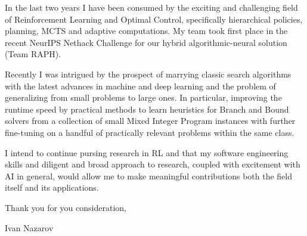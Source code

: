 \documentclass[14pt]{letter}
\begin{document}
In the last two years I have been consumed by the exciting and challenging field of Reinforcement
Learning and Optimal Control, specifically hierarchical policies, planning, MCTS and adaptive
computations. My team took first place in the recent NeurIPS Nethack Challenge for our hybrid
algorithmic-neural solution (Team RAPH).

Recently I was intrigued by the prospect of marrying classic search algorithms with the latest
advances in machine and deep learning and the problem of generalizing from small problems
to large ones. In particular, improving the runtime speed by practical methods to learn heuristics
for Branch and Bound solvers from a collection of small Mixed Integer Program instances with
further fine-tuning on a handful of practically relevant problems within the same class.

I intend to continue pursing research in RL and  that my software engineering skills and
diligent and broad approach to research, coupled with excitement with AI in general, would
allow me to make meaningful contributions both the field itself and its applications.
\par\medskip


\hfill Thank you for you consideration,\par%
\hfill Ivan Nazarov
\end{document}
